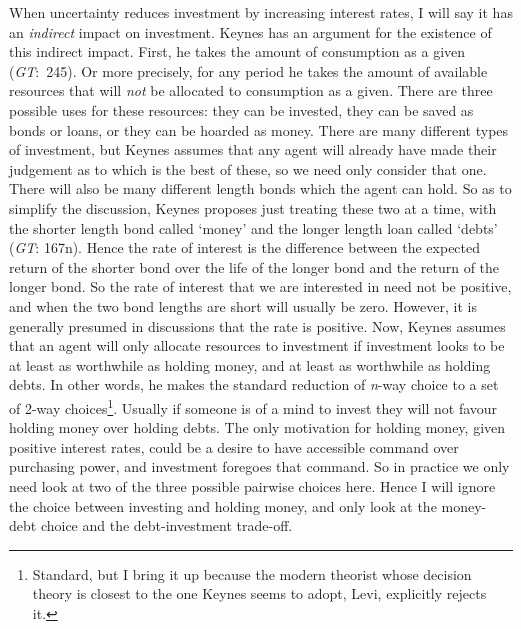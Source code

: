 \documentclass[
  11pt,
  letterpaper,
  DIV=11,
  numbers=noendperiod,
  twoside]{scrartcl}
\begin{document}
When uncertainty reduces investment by increasing interest rates, I will
say it has an \emph{indirect} impact on investment. Keynes has an
argument for the existence of this indirect impact. First, he takes the
amount of consumption as a given (\emph{GT}:~245). Or more precisely,
for any period he takes the amount of available resources that will
\emph{not} be allocated to consumption as a given. There are three
possible uses for these resources: they can be invested, they can be
saved as bonds or loans, or they can be hoarded as money. There are many
different types of investment, but Keynes assumes that any agent will
already have made their judgement as to which is the best of these, so
we need only consider that one. There will also be many different length
bonds which the agent can hold. So as to simplify the discussion, Keynes
proposes just treating these two at a time, with the shorter length bond
called `money' and the longer length loan called `debts' (\emph{GT}:
167n). Hence the rate of interest is the difference between the expected
return of the shorter bond over the life of the longer bond and the
return of the longer bond. So the rate of interest that we are
interested in need not be positive, and when the two bond lengths are
short will usually be zero. However, it is generally presumed in
discussions that the rate is positive. Now, Keynes assumes that an agent
will only allocate resources to investment if investment looks to be at
least as worthwhile as holding money, and at least as worthwhile as
holding debts. In other words, he makes the standard reduction of
\emph{n}-way choice to a set of 2-way choices\footnote{Standard, but I
  bring it up because the modern theorist whose decision theory is
  closest to the one Keynes seems to adopt, Levi, explicitly rejects it.}.
Usually if someone is of a mind to invest they will not favour holding
money over holding debts. The only motivation for holding money, given
positive interest rates, could be a desire to have accessible command
over purchasing power, and investment foregoes that command. So in
practice we only need look at two of the three possible pairwise choices
here. Hence I will ignore the choice between investing and holding
money, and only look at the money-debt choice and the debt-investment
trade-off.
\end{document}
